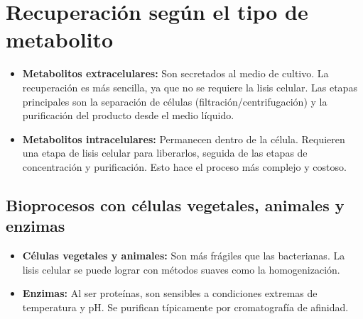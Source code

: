 
\section{Recuperación según el tipo de metabolito}

\begin{itemize}
    \item \textbf{Metabolitos extracelulares:} Son secretados al medio de cultivo. La recuperación es más sencilla, ya que no se requiere la lisis celular. Las etapas principales son la separación de células (filtración/centrifugación) y la purificación del producto desde el medio líquido.
    \item \textbf{Metabolitos intracelulares:} Permanecen dentro de la célula. Requieren una etapa de lisis celular para liberarlos, seguida de las etapas de concentración y purificación. Esto hace el proceso más complejo y costoso.
\end{itemize}


\subsection{Bioprocesos con células vegetales, animales y enzimas}

\begin{itemize}
    \item \textbf{Células vegetales y animales:} Son más frágiles que las bacterianas. La lisis celular se puede lograr con métodos suaves como la homogenización.
    \item \textbf{Enzimas:} Al ser proteínas, son sensibles a condiciones extremas de temperatura y pH. Se purifican típicamente por cromatografía de afinidad.
\end{itemize}